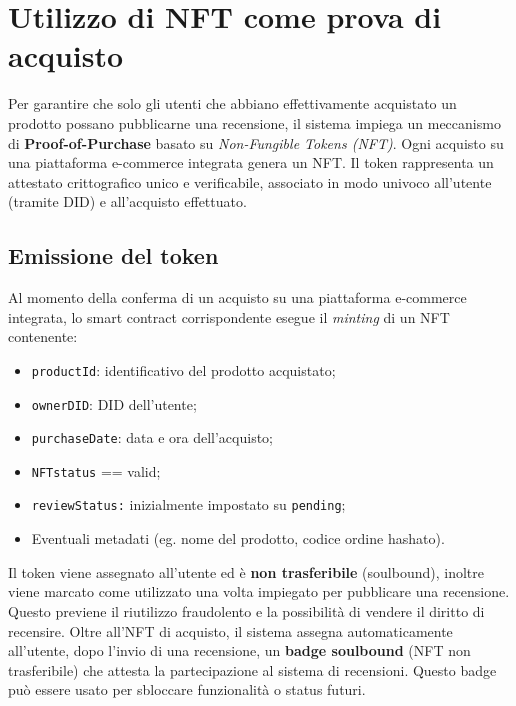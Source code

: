     \section{Utilizzo di NFT come prova di acquisto}
        Per garantire che solo gli utenti che abbiano effettivamente acquistato un prodotto possano pubblicarne una recensione, il sistema impiega un meccanismo di \textbf{Proof-of-Purchase} basato su \textit{Non-Fungible Tokens (NFT)}. Ogni acquisto su una piattaforma e-commerce integrata genera un NFT. Il token rappresenta un attestato crittografico unico e verificabile, associato in modo univoco all'utente (tramite DID) e all'acquisto effettuato.

        \subsection{Emissione del token}
            Al momento della conferma di un acquisto su una piattaforma e-commerce integrata, lo smart contract corrispondente esegue il \textit{minting} di un NFT contenente:
                \begin{itemize}
                    \item \texttt{productId}: identificativo del prodotto acquistato;
                    
                    \item \texttt{ownerDID}: DID dell'utente;
                    
                    \item \texttt{purchaseDate}: data e ora dell'acquisto;

                    \item \texttt{NFTstatus} == valid;
                    
                    \item \texttt{reviewStatus:} inizialmente impostato su \texttt{pending};
                    
                    \item Eventuali metadati (eg. nome del prodotto, codice ordine hashato).
                \end{itemize}

            \noindent Il token viene assegnato all'utente ed è \textbf{non trasferibile} (soulbound), inoltre viene marcato come utilizzato una volta impiegato per pubblicare una recensione. Questo previene il riutilizzo fraudolento e la possibilità di vendere il diritto di recensire.
            Oltre all'NFT di acquisto, il sistema assegna automaticamente all'utente, dopo l'invio di una recensione,  un \textbf{badge soulbound} (NFT non trasferibile) che attesta la partecipazione al sistema di recensioni. Questo badge può essere usato per sbloccare funzionalità o status futuri.


